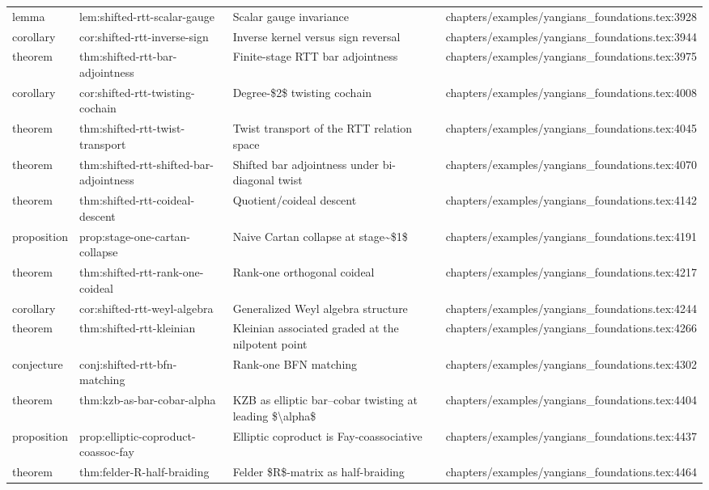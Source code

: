 \documentclass[11pt]{article}
\begin{document}
\begin{longtable}{L{0.10\textwidth}L{0.26\textwidth}L{0.42\textwidth}L{0.22\textwidth}}
lemma & lem:shifted-rtt-scalar-gauge & Scalar gauge invariance & chapters/examples/yangians\_foundations.tex:3928\\
corollary & cor:shifted-rtt-inverse-sign & Inverse kernel versus sign reversal & chapters/examples/yangians\_foundations.tex:3944\\
theorem & thm:shifted-rtt-bar-adjointness & Finite-stage RTT bar adjointness & chapters/examples/yangians\_foundations.tex:3975\\
corollary & cor:shifted-rtt-twisting-cochain & Degree-\$2\$ twisting cochain & chapters/examples/yangians\_foundations.tex:4008\\
theorem & thm:shifted-rtt-twist-transport & Twist transport of the RTT relation space & chapters/examples/yangians\_foundations.tex:4045\\
theorem & thm:shifted-rtt-shifted-bar-adjointness & Shifted bar adjointness under bi-diagonal twist & chapters/examples/yangians\_foundations.tex:4070\\
theorem & thm:shifted-rtt-coideal-descent & Quotient/coideal descent & chapters/examples/yangians\_foundations.tex:4142\\
proposition & prop:stage-one-cartan-collapse & Naive Cartan collapse at stage\textasciitilde{}\$1\$ & chapters/examples/yangians\_foundations.tex:4191\\
theorem & thm:shifted-rtt-rank-one-coideal & Rank-one orthogonal coideal & chapters/examples/yangians\_foundations.tex:4217\\
corollary & cor:shifted-rtt-weyl-algebra & Generalized Weyl algebra structure & chapters/examples/yangians\_foundations.tex:4244\\
theorem & thm:shifted-rtt-kleinian & Kleinian associated graded at the nilpotent point & chapters/examples/yangians\_foundations.tex:4266\\
conjecture & conj:shifted-rtt-bfn-matching & Rank-one BFN matching & chapters/examples/yangians\_foundations.tex:4302\\
theorem & thm:kzb-as-bar-cobar-alpha & KZB as elliptic bar--cobar twisting at leading \$\textbackslash{}alpha\$ & chapters/examples/yangians\_foundations.tex:4404\\
proposition & prop:elliptic-coproduct-coassoc-fay & Elliptic coproduct is Fay-coassociative & chapters/examples/yangians\_foundations.tex:4437\\
theorem & thm:felder-R-half-braiding & Felder \$R\$-matrix as half-braiding & chapters/examples/yangians\_foundations.tex:4464\\

\end{longtable}
\end{document}
